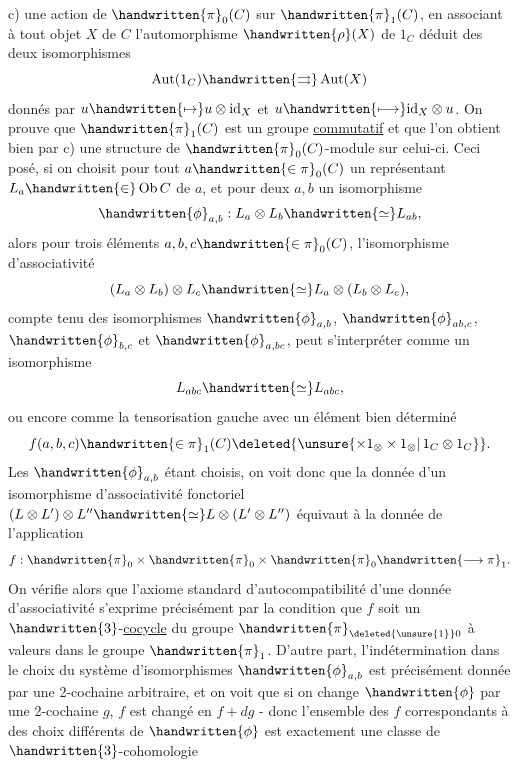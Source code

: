 c) une action de $\handwritten{\pi}_0(C)$ sur $\handwritten{\pi}_1(C)$, en associant à tout objet $X$ de $C$ l'automorphisme  $\handwritten{\rho}(X)$ de $1_C$ déduit des deux isomorphismes
\[
\operatorname{Aut}(1_C)\handwritten{\rightrightarrows}\operatorname{Aut}(X)
\]
donnés par $u\handwritten{\mapsto}u\otimes\mathrm{id}_X$ et $u\handwritten{\longmapsto}\mathrm{id}_X\otimes u$. On prouve que $\handwritten{\pi}_1(C)$ est un groupe \uline{commutatif} et que l'on obtient bien par c) une structure de $\handwritten{\pi}_0(C)$-module sur celui-ci. Ceci posé, si on choisit pour tout $a\handwritten{\in\pi}_0(C)$ un représentant $L_a\handwritten{\in}\operatorname{Ob}C$ de $a$, et pour deux  $a,b$ un isomorphisme
\[
\handwritten{\phi}_{a,b}: L_a\otimes L_b\handwritten{\simeq}L_{ab},
\]
alors pour trois éléments $a,b,c\handwritten{\in\pi}_0(C)$, l'isomorphisme d'associativité
\[
(L_a\otimes L_b)\otimes L_c\handwritten{\simeq}L_a\otimes(L_b\otimes L_c),
\]
compte tenu des isomorphismes $\handwritten{\phi}_{a,b}$, $\handwritten{\phi}_{ab,c}$, $\handwritten{\phi}_{b,c}$ et $\handwritten{\phi}_{a,bc}$, peut s'interpréter comme un isomorphisme
\[
L_{abc}\handwritten{\simeq}L_{abc},
\]
ou encore comme la tensorisation  gauche avec un élément bien déterminé
\[
f(a,b,c)\handwritten{\in\pi}_1(C)\deleted{\unsure{\times1_{\otimes}\times1_{\otimes}|\,1_C\otimes1_C}}.
\]
Les $\handwritten{\phi}_{a,b}$ étant choisis, on voit donc que la donnée d'un isomorphisme d'associativité fonctoriel $(L\otimes L')\otimes L''\handwritten{\simeq}L\otimes(L'\otimes L'')$ équivaut à la donnée de l'application
\[
f:\handwritten{\pi}_0\times\handwritten{\pi}_0\times\handwritten{\pi}_0\handwritten{\longrightarrow\pi}_1.
\]
On vérifie alors que l'axiome standard d'autocompatibilité d'une donnée d'associativité s'exprime précisément par la condition que $f$ soit un $\handwritten{3}$-\uline{cocycle} du groupe $\handwritten{\pi}_{\deleted{\unsure{1}}0}$ à valeurs dans le groupe $\handwritten{\pi}_1$. D'autre part, l'indétermination dans le choix du système d'isomorphismes $\handwritten{\phi}_{a,b}$ est précisément donnée par une 2-cochaine arbitraire, et on voit que si on change $\handwritten{\phi}$ par une 2-cochaine $g$, $f$ est changé en $f+dg$ - donc l'ensemble des $f$ correspondants à des choix différents de $\handwritten{\phi}$ est exactement une classe de $\handwritten{3}$-cohomologie
